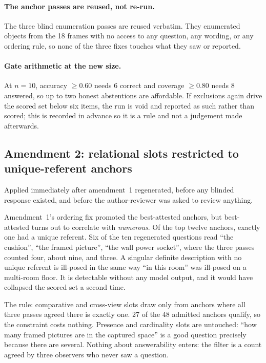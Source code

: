 \paragraph{The anchor passes are reused, not re-run.} The three blind
enumeration passes are reused verbatim. They enumerated objects from the 18
frames with no access to any question, any wording, or any ordering rule, so
none of the three fixes touches what they saw or reported.

\paragraph{Gate arithmetic at the new size.} At $n = 10$, accuracy
$\ge 0.60$ needs 6 correct and coverage $\ge 0.80$ needs 8 answered, so up
to two honest abstentions are affordable. If exclusions again drive the
scored set below six items, the run is void and reported as such rather
than scored; this is recorded in advance so it is a rule and not a judgement
made afterwards.

\subsection{Amendment 2: relational slots restricted to unique-referent
anchors}

Applied immediately after amendment~1 regenerated, before any blinded
response existed, and before the author-reviewer was asked to review anything.

Amendment~1's ordering fix promoted the best-attested anchors, but
best-attested turns out to correlate with \emph{numerous}. Of the top twelve
anchors, exactly one had a unique referent. Six of the ten regenerated
questions read ``the cushion'', ``the framed picture'', ``the wall power
socket'', where the three passes counted four, about nine, and three. A
singular definite description with no unique referent is ill-posed in the
same way ``in this room'' was ill-posed on a multi-room floor. It is
detectable without any model output, and it would have collapsed the scored
set a second time.

The rule: comparative and cross-view slots draw only from anchors where all
three passes agreed there is exactly one. 27 of the 48 admitted anchors
qualify, so the constraint costs nothing. Presence and cardinality slots are
untouched: ``how many framed pictures are in the captured space'' is a
good question precisely because there are several. Nothing about
answerability enters: the filter is a count agreed by three observers who
never saw a question.

